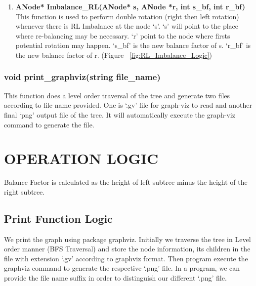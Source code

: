 \documentclass{article}
\begin{document}
\begin{enumerate}
\item \textbf{ANode* Imbalance\_RL(ANode* s, ANode *r, int s\_bf, int r\_bf)}\newline
    \label{itm:Imbalance_RL_func}
This function is used to perform double rotation (right then left rotation) whenever there is RL Imbalance at the node `s'.
`s' will point to the place where re-balancing may be necessary. `r' point to the node where firsts potential rotation may happen. `s\_bf' is the new balance factor of s. `r\_bf' is the new balance factor of r. (Figure ~\ref{fig:RL_Imbalance_Logic})

\end{enumerate}

\subsubsection{void print\_graphviz(string file\_name)}
This function does a level order traversal of the tree and generate two files according to file name provided. One is `.gv' file for graph-viz to read and another final `png' output file of the tree.
It will automatically execute the graph-viz command to generate the file.


\newpage

\section{OPERATION LOGIC} %
Balance Factor is calculated as the height of left subtree minus the height of the right subtree. 

\subsection{Print Function Logic}
We print the graph using package graphviz. 
Initially we traverse the tree in Level order manner (BFS Traversal) and store the node information, its children in the file with extension `.gv' according to graphviz format. Then program execute the graphviz command to generate the respective `.png' file. In a program, we can provide the file name suffix in order to distinguish our different `.png' file.
\end{document}
